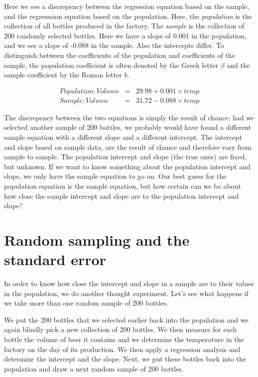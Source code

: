 \documentclass[]{book}\usepackage[]{graphicx}\usepackage[]{color}
\begin{document}
Here we see a discrepency between the regression equation based on the sample, and the regresssion equation based on the population. Here, the \textit{population} is the collection of all bottles produced in the factory. The \textit{sample} is the collection of 200 randomly selected bottles. Here we have a slope of 0.001 in the population, and we see a slope of -0.088 in the sample. Also the intercepts differ. To distinguish between the coefficients of the population and coefficients of the sample, the population coefficient is often denoted by the Greek letter $\beta$ and the sample coefficient by the Roman letter $b$.



\begin{eqnarray}
Population: Volume &=& 29.98 + 0.001 \times temp  \nonumber\\
Sample: Volume &=&  31.72  -0.088 \times temp \nonumber
\end{eqnarray}

The discrepency between the two equations is simply the result of chance: had we selected another sample of 200 bottles, we probably would have found a different sample equation with a different slope and a different intercept. The intercept and slope based on sample data, are the result of chance and therefore vary from sample to sample. The population intercept and slope (the true ones) are fixed, but unknown. If we want to know something about the population intercept and slope, we only have the sample equation to go on. Our best guess for the population equation is the sample equation, but how certain can we be about how close the sample intercept and slope are to the population intercept and slope?


\section{Random sampling and the standard error}


In order to know how close the intercept and slope in a sample are to their values in the population, we do another thought experiment. Let's see what happens if we take more than one random sample of 200 bottles. 

We put the 200 bottles that we selected earlier back into the population and we again blindly pick a new collection of 200 bottles. We then measure for each bottle the volume of beer it contains and we determine the temperature in the factory on the day of its production. We then apply a regression analysis and determine the intercept and the slope. Next, we put these bottles back into the population and draw a next random sample of 200 bottles.
\end{document}

